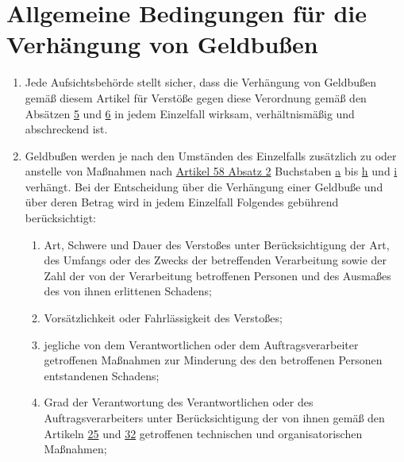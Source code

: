 \chapter{Allgemeine Bedingungen für die Verhängung von Geldbußen}
\label{ch:83}


\begin{enumerate}

  \item Jede Aufsichtsbehörde stellt sicher, dass die Verhängung von Geldbußen gemäß diesem Artikel für Verstöße gegen
   diese Verordnung gemäß den Absätzen \hyperref[itm:83-5]{5} und \hyperref[itm:83-6]{6} in jedem Einzelfall wirksam,
   verhältnismäßig und abschreckend ist.
  \label{itm:83-1}

  \item Geldbußen werden je nach den Umständen des Einzelfalls zusätzlich zu oder anstelle von Maßnahmen nach \hyperref
   [itm:58-2]{Artikel 58 Absatz 2} Buchstaben \hyperref[itm:58-2a]{a} bis \hyperref[itm:58-2h]{h} und \hyperref
   [itm:58-2i]{i} verhängt. Bei der Entscheidung über die Verhängung einer Geldbuße und über deren Betrag wird in jedem
   Einzelfall Folgendes gebührend berücksichtigt:
  \label{itm:83-2}

  \begin{enumerate}
  
    \item Art, Schwere und Dauer des Verstoßes unter Berücksichtigung der Art, des Umfangs oder des Zwecks der
     betreffenden Verarbeitung sowie der Zahl der von der Verarbeitung betroffenen Personen und des Ausmaßes des von
     ihnen erlittenen Schadens;
    \label{itm:83-2a}

    \item Vorsätzlichkeit oder Fahrlässigkeit des Verstoßes;
    \label{itm:83-2b}

    \item jegliche von dem Verantwortlichen oder dem Auftragsverarbeiter getroffenen Maßnahmen zur Minderung des den
     betroffenen Personen entstandenen Schadens;
    \label{itm:83-2c}

    \item Grad der Verantwortung des Verantwortlichen oder des Auftragsverarbeiters unter Berücksichtigung der von ihnen
     gemäß den Artikeln \hyperref[ch:25]{25} und \hyperref[ch:32]{32} getroffenen technischen und organisatorischen
     Maßnahmen;
    \label{itm:83-2d}


\end{enumerate}
\end{enumerate}
